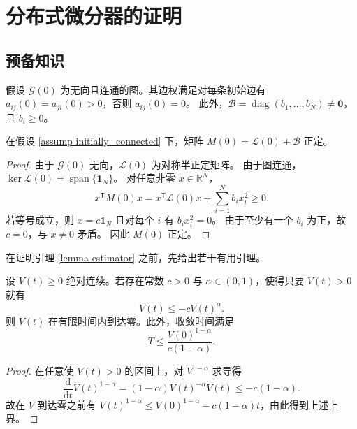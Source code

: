 \section{分布式微分器的证明}

\subsection{预备知识}

\begin{assumption} \label{assump initially_connected}
    假设 $\mathcal{G}(0)$ 为无向且连通的图。其边权满足对每条初始边有 $a_{ij}(0)=a_{ji}(0)>0$，否则 $a_{ij}(0)=0$。
    此外，$\mathcal{B}=\operatorname{diag}(b_1,\ldots,b_N)\neq \mathbf{0}$，且 $b_i\ge 0$。
\end{assumption}

\begin{lemma}
    \label{lemma M>0}
    在假设 \ref{assump initially_connected} 下，矩阵 $M(0)=\mathcal{L}(0)+\mathcal{B}$ 正定。
\end{lemma}
\begin{proof}
    由于 $\mathcal{G}(0)$ 无向，$\mathcal{L}(0)$ 为对称半正定矩阵。
    由于图连通，$\operatorname{ker}\mathcal{L}(0)=\operatorname{span}\{\mathbf{1}_N\}$。
    对任意非零 $x\in\mathbb{R}^N$，
    \[
        x^\mathsf{T}M(0)x=x^\mathsf{T}\mathcal{L}(0)x+\sum_{i=1}^N b_i x_i^2\ge 0.
    \]
    若等号成立，则 $x=c\mathbf{1}_N$ 且对每个 $i$ 有 $b_i x_i^2=0$。
    由于至少有一个 $b_i$ 为正，故 $c=0$，与 $x\neq 0$ 矛盾。
    因此 $M(0)$ 正定。
\end{proof}

在证明引理 \ref{lemma estimator} 之前，先给出若干有用引理。

\begin{lemma}[有限时间比较]\label{lemma:finite_time}
    设 $V(t)\ge 0$ 绝对连续。若存在常数 $c>0$ 与 $\alpha\in(0,1)$，使得只要 $V(t)>0$ 就有
    \begin{equation}
        \dot{V}(t)\leq -cV(t)^\alpha.
    \end{equation}
    则 $V(t)$ 在有限时间内到达零。此外，收敛时间满足
    \begin{equation}
        T\leq \frac{V(0)^{1-\alpha}}{c(1-\alpha)}.
    \end{equation}
\end{lemma}
\begin{proof}
    在任意使 $V(t)>0$ 的区间上，对 $V^{1-\alpha}$ 求导得
    \[
        \frac{\mathrm{d}}{\mathrm{d}t}V(t)^{1-\alpha}
        =(1-\alpha)V(t)^{-\alpha}\dot V(t)
        \le -c(1-\alpha).
    \]
    故在 $V$ 到达零之前有 $V(t)^{1-\alpha}\le V(0)^{1-\alpha}-c(1-\alpha)t$，由此得到上述上界。
\end{proof}

